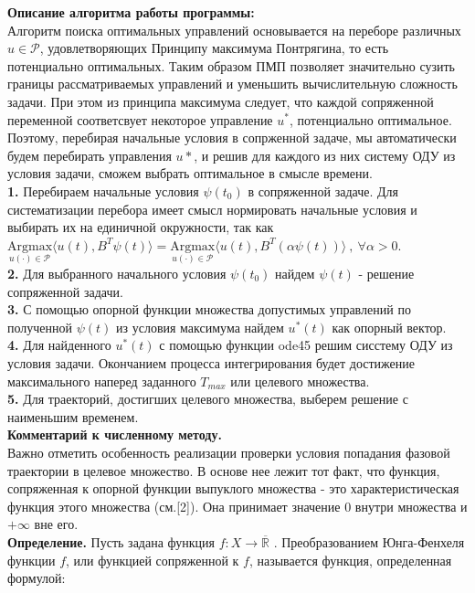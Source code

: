 \documentclass[10pt]{article}
\begin{document}
\textbf{Описание алгоритма работы программы:}\medskip\\
Алгоритм поиска оптимальных управлений основывается на переборе различных \( u \in \mathcal{P} \), удовлетворяющих Принципу максимума Понтрягина, то есть потенциально оптимальных. Таким образом ПМП позволяет значительно сузить границы рассматриваемых управлений и уменьшить вычислительную сложность задачи. При этом из принципа максимума следует, что каждой сопряженной переменной соответсвует некоторое управление \( u^* \), потенциально оптимальное. Поэтому, перебирая начальные условия в сопрженной задаче, мы автоматически будем перебирать управления \( u* \), и решив для каждого из них систему ОДУ из условия задачи, сможем выбрать оптимальное в смысле времени.\bigskip\\
\textbf{1.} Перебираем начальные условия \( \psi(t_0) \) в сопряженной задаче. Для систематизации перебора имеет смысл нормировать начальные условия и выбирать их на единичной окружности, так как \( \underset{u(\cdot) \in \mathcal{P}}{\text{Argmax}} \langle u(t), B^T \psi(t) \rangle = \underset{u(\cdot) \in \mathcal{P}}{\text{Argmax}} \langle u(t), B^T (\alpha \psi(t)) \rangle \ , \ \forall \alpha > 0. \)\medskip\\
\textbf{2.} Для выбранного начального условия \( \psi(t_0) \) найдем \( \psi(t) \) - решение сопряженной задачи.\medskip\\
\textbf{3.} С помощью опорной функции множества допустимых управлений по полученной \( \psi(t) \) из условия максимума найдем \( u^*(t) \) как опорный вектор.\medskip\\
\textbf{4.} Для найденного \( u^*(t) \) с помощью функции ode45 решим сисстему ОДУ из условия задачи. Окончанием процесса интегрирования будет достижение максимального наперед заданного \( T_{max} \) или целевого множества.\medskip\\
\textbf{5.} Для траекторий, достигших целевого множества, выберем решение с наименьшим временем. \medskip\\
\textbf{Комментарий к численному методу.}\medskip\\
Важно отметить особенность реализации проверки условия попадания фазовой траектории в целевое множество. В основе нее лежит тот факт, что функция, сопряженная к опорной функции выпуклого множества - это характеристическая функция этого множества (см.[2]). Она принимает значение 0 внутри множества и \( + \infty \) вне его. \smallskip\\
\textbf{Определение.} Пусть задана функция \( f: X \to \overline{\mathbb{R}} \) . Преобразованием Юнга-Фенхеля функции \( f \), или функцией сопряженной к \( f \), называется функция, определенная формулой: 
\end{document}
